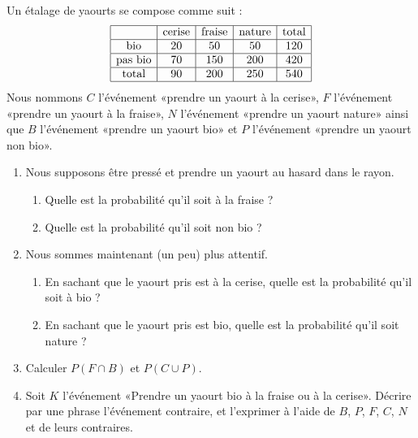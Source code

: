 
\begin{exercice}\label{exosmath-0712}

    Un étalage de yaourts se compose comme suit :
    \begin{equation*}
        \begin{array}[]{|c|c|c|c|c|}
            \hline
            &\text{cerise}&\text{fraise}&\text{nature}&\text{total}\\
            \hline
            \text{bio}&20&50&50&120\\
            \hline
            \text{pas bio}&70&150&200&420\\
            \hline
            \text{total}&90&200&250&540\\
            \hline
        \end{array}
    \end{equation*}
    Nous nommons \( C\) l'événement «prendre un yaourt à la cerise», \( F\) l'événement «prendre un yaourt à la fraise», \( N\) l'événement «prendre un yaourt nature» ainsi que \( B\) l'événement «prendre un yaourt bio» et \( P\) l'événement «prendre un yaourt non bio».

    \begin{enumerate}
        \item
            
            Nous supposons être pressé et prendre un yaourt au hasard dans le rayon.
            \begin{enumerate}
                \item
                    Quelle est la probabilité qu'il soit à la fraise ?
                \item
                    Quelle est la probabilité qu'il soit non bio ?
            \end{enumerate}

        \item
            Nous sommes maintenant (un peu) plus attentif.

            \begin{enumerate}
                \item
                    En sachant que le yaourt pris est à la cerise, quelle est la probabilité qu'il soit à bio ?
                \item
                    En sachant que le yaourt pris est bio, quelle est la probabilité qu'il soit nature ?
            \end{enumerate}

        \item

            Calculer \( P(F\cap B)\) et \( P(C\cup P)\).
        \item
            Soit \( K\) l'événement «Prendre un yaourt bio à la fraise ou à la cerise». Décrire par une phrase l'événement contraire, et l'exprimer à l'aide de \( B\), \( P\), \( F\), \( C\), \( N\) et de leurs contraires.
    \end{enumerate}

\end{exercice}
